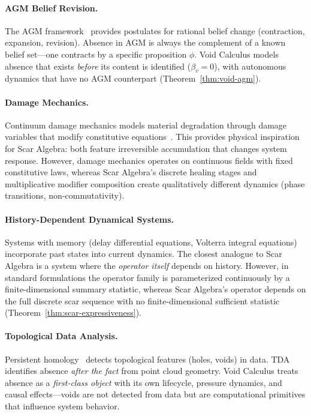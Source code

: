\documentclass[11pt]{article}
\begin{document}
\paragraph{AGM Belief Revision.}
The AGM framework~\cite{agm1985} provides postulates for rational belief change (contraction, expansion, revision). Absence in AGM is always the complement of a known belief set---one contracts by a specific proposition $\phi$. Void Calculus models absence that exists \emph{before} its content is identified ($\beta_v = 0$), with autonomous dynamics that have no AGM counterpart (Theorem~\ref{thm:void-agm}).

\paragraph{Damage Mechanics.}
Continuum damage mechanics models material degradation through damage variables that modify constitutive equations~\cite{lemaitre1996}. This provides physical inspiration for Scar Algebra: both feature irreversible accumulation that changes system response. However, damage mechanics operates on continuous fields with fixed constitutive laws, whereas Scar Algebra's discrete healing stages and multiplicative modifier composition create qualitatively different dynamics (phase transitions, non-commutativity).

\paragraph{History-Dependent Dynamical Systems.}
Systems with memory (delay differential equations, Volterra integral equations) incorporate past states into current dynamics. The closest analogue to Scar Algebra is a system where the \emph{operator itself} depends on history. However, in standard formulations the operator family is parameterized continuously by a finite-dimensional summary statistic, whereas Scar Algebra's operator depends on the full discrete scar sequence with no finite-dimensional sufficient statistic (Theorem~\ref{thm:scar-expressiveness}).

\paragraph{Topological Data Analysis.}
Persistent homology~\cite{edelsbrunner2010} detects topological features (holes, voids) in data. TDA identifies absence \emph{after the fact} from point cloud geometry. Void Calculus treats absence as a \emph{first-class object} with its own lifecycle, pressure dynamics, and causal effects---voids are not detected from data but are computational primitives that influence system behavior.
\end{document}
